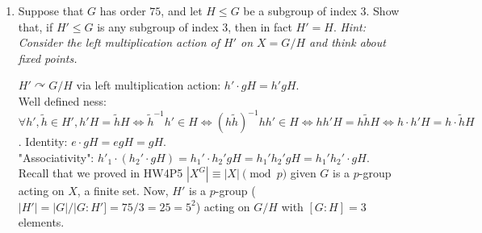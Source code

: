 \documentclass{amsart}
\begin{document}
\begin{enumerate}[itemsep=0.2in]
\begin{proof}
    Suppose a nonidentity element $g\in\ker\rho$ exists. Claim: $\rho(g)=\rho(g^2)$

    First, $g\in\ker\rho\implies\rho(g)=\mathrm{Id}$. Then, $\rho(g^2)=\rho(g)\circ\rho(g)=\mathrm{Id}\circ\mathrm{Id}=\mathrm{Id}$.

    Now, $g^2\neq g$, for $g^2=g\implies g=e$ is a contradiction. However, $\rho(g)=\rho(g^2)\land g\neq g^2$. As such, injectivity must fail.
    
\end{proof}

\begin{lemma}
    $gHg^{-1}=H$ if $G$ is abelian.
\end{lemma}

\begin{proof}
    $\forall h\in H,ghg^{-1}=gg^{-1}h=h\in H$. Therefore, $gHg^{-1}\subseteq H$. Now, $\forall h\in H,hg=gh\implies h=ghg^{-1}\in gHg^{-1}$, proving $H\subseteq gHg^{-1}$. Therefore, $gHg^{-1}=H$.
    
\end{proof}

From problem 6c, $\ker\rho=\cap_{g\in G}gHg^{-1}=\cap_{g\in G}H=H$ is nontrivial. So $\rho$ is never injective, and the group action is never faithful.




\vspace{0.2in}

\item Suppose that $G$ has order $75$, and let $H\leq G$ be a subgroup of index $3$. Show that, if $H'\leq G$ is any subgroup of index $3$, then in fact $H'=H$. \emph{Hint: Consider the left multiplication action of $H'$ on $X=G/H$ and think about fixed points.}


$H'\curvearrowright G/H$ via left multiplication action: $h'\cdot gH=h'gH$.\\

Well defined ness: $\forall h',\tilde{h}\in H',h'H=\tilde{h}H\iff\tilde{h}^{-1}h'\in H\iff(h\tilde{h})^{-1}hh'\in H\iff hh'H=h\tilde{h}H\iff h\cdot h'H=h\cdot \tilde{h}H$.
Identity: $e\cdot gH=egH=gH$.\\
"Associativity": $h'_1\cdot(h_2'\cdot gH)=h_1'\cdot h_2'gH=h_1'h_2'gH=h_1'h_2'\cdot gH$.\\

Recall that we proved in HW4P5 $|X^G|\equiv|X|\pmod p$ given $G$ is a $p$-group acting on $X$, a finite set. Now, $H'$ is a $p$-group ($|H'|=|G|/|G:H']=75/3=25=5^2$) acting on $G/H$ with $[G:H]=3$ elements. \\


\end{enumerate}
\end{document}
